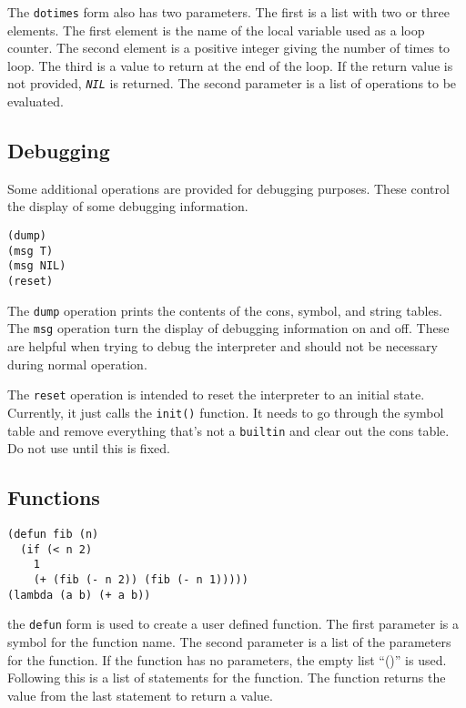 \documentclass[10pt, openany]{book}
\newcommand{\function}[1]{\texttt{#1}}
\newcommand{\constant}[1]{\emph{\texttt{#1}}}
\begin{document}
The \function{dotimes} form also has two parameters.  The first is a list with two or three elements.  The first element is the name of the local variable used as a loop counter.  The second element is a positive integer giving the number of times to loop.  The third is a value to return at the end of the loop.  If the return value is not provided, \constant{NIL} is returned.  The second parameter is a list of operations to be evaluated.

\subsection{Debugging}
Some additional operations are provided for debugging purposes.  These control the display of some debugging information.

\begin{lstlisting}
(dump)
(msg T)
(msg NIL)
(reset)
\end{lstlisting}

The \function{dump} operation prints the contents of the cons, symbol, and string tables.  The \function{msg} operation turn the display of debugging information on and off.  These are helpful when trying to debug the interpreter and should not be necessary during normal operation.

The \function{reset} operation is intended to reset the interpreter to an initial state.  Currently, it just calls the \function{init()} function.  It needs to go through the symbol table and remove everything that's not a \function{builtin} and clear out the cons table.  Do not use until this is fixed.

\subsection{Functions}
\begin{lstlisting}
(defun fib (n)
  (if (< n 2)
    1
    (+ (fib (- n 2)) (fib (- n 1)))))
(lambda (a b) (+ a b))
\end{lstlisting}

the \function{defun} form is used to create a user defined function.  The first parameter is a symbol for the function name.  The second parameter is a list of the parameters for the function.  If the function has no parameters, the empty list ``()'' is used.  Following this is a list of statements for the function.  The function returns the value from the last statement to return a value.\\
\end{document}
